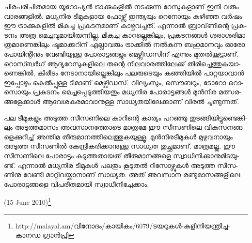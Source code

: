 ­ചി­ര­പ­രി­ചി­ത­മായ യൂ­റോ­പ്യന്‍ ട്രാ­ക്കു­ക­ളില്‍ നട­ക്കു­ന്ന റേ­സു­ക­ളാ­ണ് ഇനി വരും വാ­ര­ങ്ങ­ളില്‍. മധ്യ­നിര ടീ­മു­ക­ളായ ഫോ­ഴ്സ്
ഇന്ത്യ­യും റെ­നോ­യും കഴി­ഞ്ഞ വര്‍­ഷം ഈ ട്രാ­ക്കു­ക­ളില്‍ മി­ക­ച്ച പ്ര­ക­ട­ന­മാ­ണ് കാ­ഴ്ച­വ­ച്ച­ത്. എന്നാല്‍ ബ്രാ­വ്‌­ണി­ന്റെ 
പ്ര­ക­ട­നം അത്ര മെ­ച്ച­വു­മാ­യി­രു­ന്നി­ല്ല. മി­ക­ച്ച കാ­റ­ല്ലെ­ങ്കി­ലും, പ്ര­ക­ട­ന­ങ്ങള്‍ ശരാ­ശ­രി­മാ­ത്ര­മാ­ണെ­ങ്കി­ലും ഷൂ­മാ­ക്ക­റി­ന് 
എല്ലാ­വ­രും ട്രാ­ക്കില്‍ നല്‍­കു­ന്ന ബഹു­മാ­ന­വും ഓരോ പോ­യി­ന്റി­നും വേ­ണ്ടി­യു­ള്ള പോ­രാ­ട്ട­ങ്ങ­ളും മെ­ഴ്സി­ഡ­സി­ന് എന്നും 
മു­തല്‍­ക്കൂ­ട്ടാ­ണ്. റൊ­സ്ബര്‍­ഗ് ആദ്യ­റേ­സു­ക­ളി­ലെ തന്റെ നി­ല­വാ­ര­ത്തി­ലേ­ക്ക് തി­രി­ച്ചെ­ത്തു­ക­യാ­ണെ­ങ്കില്‍, കി­രീ­ടം 
നേ­ടാ­നാ­യി­ല്ലെ­ങ്കി­ലും പല­രു­ടെ­യും കഞ്ഞി­യില്‍ പാ­റ്റ­യാ­വാന്‍ ഇപ്പോ­ഴും കെല്‍­പ്പു­ള്ള ടീ­മാ­ണ് മെ­ഴ്സി­ഡ­സ്. വി­ല്യം­സും, 
സൌ­ബ­റും, ടോ­റോ റൊ­സൊ­യും പ്ര­ക­ട­നം മെ­ച്ച­പ്പെ­ടു­ത്തി­യ­തും മധ്യ­നിര പോ­രാ­ട്ട­ങ്ങള്‍ മുന്‍­നിര മത്സ­ര­ങ്ങ­ളേ­ക്കാള്‍ 
ആവേ­ശ­ക­ര­മാ­വാ­നു­ള്ള സാ­ധ്യ­ത­യി­ലേ­ക്കാ­ണ് വി­രല്‍ ചൂ­ണ്ടു­ന്ന­ത്.

­പല ടീ­മു­ക­ളും അടു­ത്ത സീ­സ­ണി­ലെ കാ­റി­ന്റെ കാ­ര്യം പറ­ഞ്ഞു തു­ട­ങ്ങി­യി­ട്ടു­ണ്ടെ­ങ്കി­ലും അടു­ത്ത­മാ­സം അവ­സാ­ന­ത്തോ­ടെ 
മാ­ത്ര­മേ ഈ സീ­സ­ണി­ലെ വി­ക­സ­ന­ങ്ങ­ളെ­ക്കു­റി­ച്ച് അന്തിമ തീ­രു­മാ­ന­ത്തി­ലെ­ത്തു­ക­യു­ള്ളൂ. മുന്‍­നി­ര­ടീ­മു­കള്‍ മു­ഴു­വ­നാ­യും 
അടു­ത്ത സീ­സ­ണില്‍ കേ­ന്ദ്രീ­ക­രി­ക്കാ­നു­ള്ള സാ­ധ്യത തു­ച്ഛ­മാ­ണ്. മാ­ത്ര­മ­ല്ല, ഈ സീ­സ­ണി­ലെ പോ­രാ­ട്ടം കടു­ത്ത­താ­യ­ത് 
തീ­രു­മാ­ന­ങ്ങ­ളെ സ്വാ­ധീ­നി­ക്കാ­നു­മി­ട­യു­ണ്ട്. എന്നാല്‍ മധ്യ­നിര ടീ­മു­കള്‍ പല­തും കൂ­ടു­തല്‍ റി­സോ­ഴ്സു­കള്‍ അടു­ത്ത സീ­സ­ണി­നു 
വേ­ണ്ടി മാ­റ്റി­വ­യ്ക്കാ­നാ­ണ് സാ­ധ്യ­ത. അത് അവ­സാന രണ്ടു­മാ­സ­ങ്ങ­ളി­ലെ പോ­രാ­ട്ട­ങ്ങ­ളെ വി­പ­രീ­ത­മാ­യി സ്വാ­ധീ­നി­ച്ചേ­ക്കാം­.

(15 June 2010)\footnote{http://malayal.am/വിനോദം/കായികം/6079/ടയറുകള്‍-കളിനിയന്ത്രിച്ച-കാനഡ-ഗ്രാന്‍പ്രി}

\newpage
